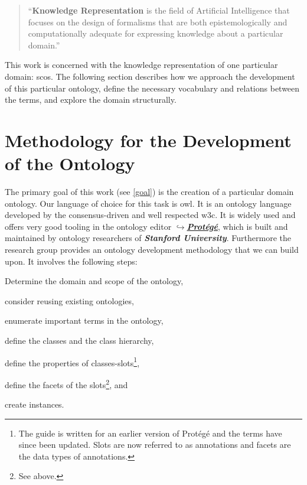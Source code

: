 \documentclass[a4paper, DIV=13, BCOR=0cm]{scrbook}
\newcommand{\pn}[1]{\textit{\textbf{#1}}}
\newcommand{\link}[2]{\href{#1}{$\hookrightarrow$#2}}
\begin{document}
\begin{quote}
	\enquote{\textbf{Knowledge Representation} is the field of Artificial Intelligence that focuses on the design of formalisms that are both epistemologically and computationally adequate for expressing knowledge about a particular domain.} \cite[p.\,XV, Preface]{baader2017introduction}
\end{quote}

This work is concerned with the knowledge representation of one particular domain: \glspl{sco}. The following section describes how we approach the development of this particular ontology, define the necessary vocabulary and relations between the terms, and explore the domain structurally.

\section{Methodology for the Development of the Ontology}
\label{methodology}
The primary goal of this work (see \autoref{goal}) is the creation of a particular domain ontology. Our language of choice for this task is \gls{owl}. It is an ontology language developed by the consensus-driven and well respected \gls{w3c}. \cite[p.\,206]{baader2017introduction} It is widely used and offers very good tooling in the ontology editor \link{https://protege.stanford.edu}{\pn{Protégé}}, which is built and maintained by ontology researchers of \pn{Stanford University}. \cite{musen2015protege} Furthermore the research group provides an ontology development methodology \cite{guide-to-ontology} that we can build upon. It involves the following steps:
\begin{compactenum}
	\item Determine the domain and scope of the ontology,
	\item consider reusing existing ontologies,
	\item enumerate important terms in the ontology,
	\item define the classes and the class hierarchy,
	\item define the properties of classes-slots\footnote{The guide is written for an earlier version of Protégé and the terms have since been updated. Slots are now referred to as annotations and facets are the data types of annotations.},
	\item define the facets of the slots\footnote{See above.}, and
	\item create instances.
\end{compactenum}
\end{document}
